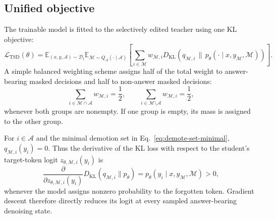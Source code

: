 \documentclass{article}
\newcommand{\Df}{\mathcal{D}_{\mathrm f}}
\newcommand{\Mset}{\mathcal{M}}
\newcommand{\Aset}{\mathcal{A}}
\newcommand{\KL}{D_{\mathrm{KL}}}
\newcommand{\Qans}{Q_{\Aset}}
\begin{document}
\subsection{Unified objective}
The trainable model is fitted to the selectively edited teacher using one KL
objective:
\begin{equation}
\boxed{
\mathcal{L}_{\mathrm{TSD}}(\theta)
=
\mathbb{E}_{(x,y,\Aset)\sim\Df}
\mathbb{E}_{\Mset\sim\Qans(\cdot\mid\Aset)}
\left[
\sum_{i\in\Mset}
    w_{\Mset,i}
    \KL\!\left(
        q_{\Mset,i}
        \,\|\,
        p_{\theta}(\cdot\mid x,y_{\Mset},\Mset)
    \right)
\right].
}
\label{eq:tsd}
\end{equation}
A simple balanced weighting scheme assigns half of the total weight to
answer-bearing masked decisions and half to non-answer masked decisions:
\begin{equation}
\sum_{i\in\Mset\cap\Aset}w_{\Mset,i}=\frac{1}{2},
\qquad
\sum_{i\in\Mset\setminus\Aset}w_{\Mset,i}=\frac{1}{2},
\label{eq:balanced-weight}
\end{equation}
whenever both groups are nonempty. If one group is empty, its mass is assigned
to the other group.

For $i\in\Aset$ and the minimal demotion set in
Eq.~\eqref{eq:demote-set-minimal}, $q_{\Mset,i}(y_i)=0$. Thus the derivative of
the KL loss with respect to the student's target-token logit
$z_{\theta,\Mset,i}(y_i)$ is
\begin{equation}
    \frac{\partial}{\partial z_{\theta,\Mset,i}(y_i)}
    \KL(q_{\Mset,i}\|p_{\theta})
    =
    p_{\theta}(y_i\mid x,y_{\Mset},\Mset) > 0,
    \label{eq:nonzero-gradient}
\end{equation}
whenever the model assigns nonzero probability to the forgotten token. Gradient
descent therefore directly reduces its logit at every sampled answer-bearing
denoising state.
\end{document}
